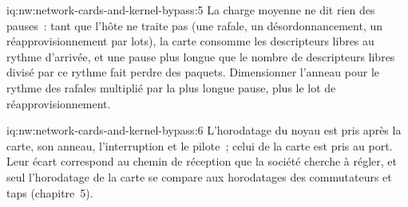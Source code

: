 \begin{solution}{iq:nw:network-cards-and-kernel-bypass:5}
La charge moyenne ne dit rien des pauses~: tant que l'hôte ne traite pas (une rafale, un désordonnancement, un réapprovisionnement par lots), la carte consomme
les descripteurs libres au rythme d'arrivée, et une pause plus longue que le nombre de descripteurs libres divisé par ce rythme fait perdre des paquets. Dimensionner l'anneau pour le
rythme des rafales multiplié par la plus longue pause, plus le lot de réapprovisionnement.
\end{solution}

\begin{solution}{iq:nw:network-cards-and-kernel-bypass:6}
L'horodatage du noyau est pris après la carte, son anneau, l'interruption et le pilote~; celui de la carte est pris au port. Leur
écart correspond au chemin de réception que la société cherche à régler, et seul l'horodatage de la carte se compare aux horodatages des commutateurs et
taps (chapitre~5).
\end{solution}
